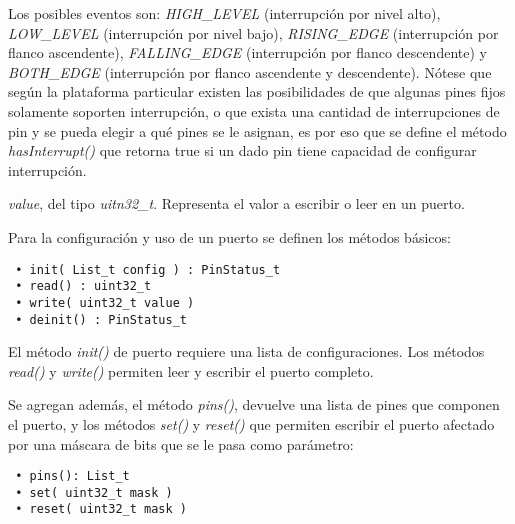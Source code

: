 Los posibles eventos son: \emph{HIGH\_LEVEL} (interrupción por nivel alto), \emph{LOW\_LEVEL} (interrupción por nivel bajo), \emph{RISING\_EDGE} (interrupción por flanco ascendente), \emph{FALLING\_EDGE} (interrupción por flanco descendente) y \emph{BOTH\_EDGE} (interrupción por flanco ascendente y descendente). Nótese que según la plataforma particular existen las posibilidades de que algunas pines fijos solamente soporten interrupción, o que exista una cantidad de interrupciones de pin y se pueda elegir a qué pines se le asignan, es por eso que se define el método \emph{hasInterrupt()} que retorna true si un dado pin tiene capacidad de configurar interrupción. 


\emph{value}, del tipo \emph{uitn32\_t}. Representa el valor a escribir o leer en un puerto.


Para la configuración y uso de un puerto se definen los métodos básicos:

\begin{verbatim}
 • init( List_t config ) : PinStatus_t
 • read() : uint32_t
 • write( uint32_t value )
 • deinit() : PinStatus_t
\end{verbatim}

El método \emph{init()} de puerto requiere una lista de configuraciones.
Los métodos \emph{read()} y \emph{write()} permiten leer y escribir el puerto completo.

Se agregan además, el método \emph{pins()}, devuelve una lista de pines que componen el puerto, y los métodos \emph{set()} y \emph{reset()} que permiten escribir el puerto afectado por una máscara de bits que se le pasa como parámetro:

\begin{verbatim}
 • pins(): List_t
 • set( uint32_t mask )
 • reset( uint32_t mask )
\end{verbatim}

